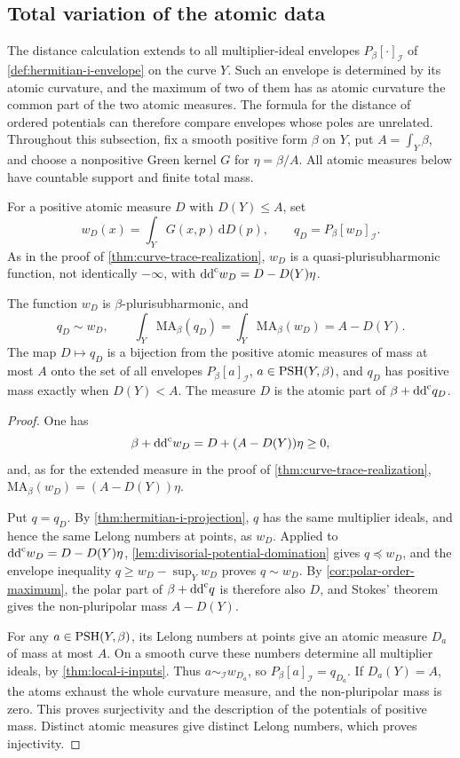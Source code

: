 \subsection{Total variation of the atomic data}
\label{sec:curve-atomic-topology}

The distance calculation extends to all multiplier-ideal envelopes $P_\beta[\cdot]_{\mathcal I}$ of \cref{def:hermitian-i-envelope} on the curve $Y$. Such an envelope is determined by its atomic curvature, and the maximum of two of them has as atomic curvature the common part of the two atomic measures. The formula for the distance of ordered potentials can therefore compare envelopes whose poles are unrelated. Throughout this subsection, fix a smooth positive form $\beta$ on $Y$, put $A=\int_Y\beta$, and choose a nonpositive Green kernel $G$ for $\eta=\beta/A$. All atomic measures below have countable support and finite total mass.

For a positive atomic measure $D$ with $D(Y)\leq A$, set
\[
 w_D(x)=\int_YG(x,p)\,\mathrm{d}D(p),\qquad
 q_D=P_\beta[w_D]_{\mathcal I}.
\]
As in the proof of \cref{thm:curve-trace-realization}, $w_D$ is a quasi-plurisubharmonic function, not identically $-\infty$, with $\mathrm{dd}^{\mathrm{c}} w_D=D-D(Y)\eta$.

\begin{lemma}\label{lem:curve-atomic-ideal-model}
The function $w_D$ is $\beta$-plurisubharmonic, and
\[
 q_D\sim w_D,\qquad
 \int_Y\mathrm{MA}_\beta(q_D)
 =\int_Y\mathrm{MA}_\beta(w_D)=A-D(Y).
\]
The map $D\mapsto q_D$ is a bijection from the positive atomic measures of mass at most $A$ onto the set of all envelopes $P_\beta[a]_{\mathcal I}$, $a\in\mathrm{PSH}(Y,\beta)$, and $q_D$ has positive mass exactly when $D(Y)<A$. The measure $D$ is the atomic part of $\beta+\mathrm{dd}^{\mathrm{c}} q_D$.
\end{lemma}
\begin{proof}
One has
\[
 \beta+\mathrm{dd}^{\mathrm{c}} w_D=D+(A-D(Y))\eta\geq0,
\]
and, as for the extended measure in the proof of \cref{thm:curve-trace-realization}, $\mathrm{MA}_\beta(w_D)=(A-D(Y))\eta$.

Put $q=q_D$. By \cref{thm:hermitian-i-projection}, $q$ has the same multiplier ideals, and hence the same Lelong numbers at points, as $w_D$. Applied to $\mathrm{dd}^{\mathrm{c}} w_D=D-D(Y)\eta$, \cref{lem:divisorial-potential-domination} gives $q\preceq w_D$, and the envelope inequality $q\geq w_D-\sup_Yw_D$ proves $q\sim w_D$. By \cref{cor:polar-order-maximum}, the polar part of $\beta+\mathrm{dd}^{\mathrm{c}} q$ is therefore also $D$, and Stokes' theorem gives the non-pluripolar mass $A-D(Y)$.

For any $a\in\mathrm{PSH}(Y,\beta)$, its Lelong numbers at points give an atomic measure $D_a$ of mass at most $A$. On a smooth curve these numbers determine all multiplier ideals, by \cref{thm:local-i-inputs}. Thus $a\sim_{\mathcal I}w_{D_a}$, so $P_\beta[a]_{\mathcal I}=q_{D_a}$. If $D_a(Y)=A$, the atoms exhaust the whole curvature measure, and the non-pluripolar mass is zero. This proves surjectivity and the description of the potentials of positive mass. Distinct atomic measures give distinct Lelong numbers, which proves injectivity.
\end{proof}

